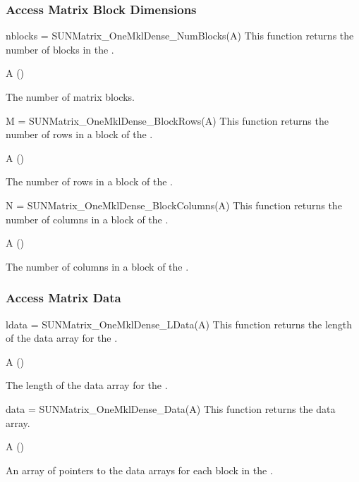 \subsubsection*{Access Matrix Block Dimensions}


{
  nblocks = SUNMatrix\_OneMklDense\_NumBlocks(A)
}
{
  This function returns the number of blocks in the .
}
{
  \begin{args}
  \item[A] ()
  \end{args}
}
{
  The number of matrix blocks.
}
{}


{
  M = SUNMatrix\_OneMklDense\_BlockRows(A)
}
{
  This function returns the number of rows in a block of the .
}
{
  \begin{args}
  \item[A] ()
  \end{args}
}
{
  The number of rows in a block of the .
}
{}


{
  N = SUNMatrix\_OneMklDense\_BlockColumns(A)
}
{
  This function returns the number of columns in a block of the .
}
{
  \begin{args}
  \item[A] ()
  \end{args}
}
{
  The number of columns in a block of the .
}
{}


\subsubsection*{Access Matrix Data}


{
  ldata = SUNMatrix\_OneMklDense\_LData(A)
}
{
  This function returns the length of the data array for the .
}
{
  \begin{args}
  \item[A] ()
  \end{args}
}
{
  The length of the data array for the .
}
{}


{
  data = SUNMatrix\_OneMklDense\_Data(A)
}
{
  This function returns the  data array.
}
{
  \begin{args}
  \item[A] ()
  \end{args}
}
{
  An array of pointers to the data arrays for each block in the .
}
{}


